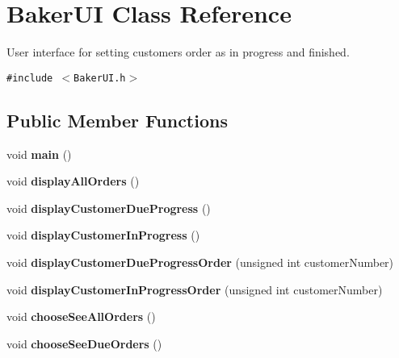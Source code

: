 \hypertarget{class_baker_u_i}{
\section{Baker\-UI Class Reference}
\label{class_baker_u_i}
}
User interface for setting customers order as in progress and finished.  


{\tt \#include $<$Baker\-UI.h$>$}

\subsection*{Public Member Functions}
\begin{CompactItemize}
\item 
\hypertarget{class_baker_u_i_ea83b916b3f52eec32ae6d54d59b4453}{
void {\bf main} ()}
\label{class_baker_u_i_ea83b916b3f52eec32ae6d54d59b4453}

\item 
\hypertarget{class_baker_u_i_d69822b9289cd53fa4da8f4f39864d19}{
void {\bf display\-All\-Orders} ()}
\label{class_baker_u_i_d69822b9289cd53fa4da8f4f39864d19}

\item 
\hypertarget{class_baker_u_i_00eeac47a993278134a2d8ba936f6f31}{
void {\bf display\-Customer\-Due\-Progress} ()}
\label{class_baker_u_i_00eeac47a993278134a2d8ba936f6f31}

\item 
\hypertarget{class_baker_u_i_49612691d8a1c466378d3e4507aff847}{
void {\bf display\-Customer\-In\-Progress} ()}
\label{class_baker_u_i_49612691d8a1c466378d3e4507aff847}

\item 
\hypertarget{class_baker_u_i_9afa245c6153335e553d88f8e7ad2c2e}{
void {\bf display\-Customer\-Due\-Progress\-Order} (unsigned int customer\-Number)}
\label{class_baker_u_i_9afa245c6153335e553d88f8e7ad2c2e}

\item 
\hypertarget{class_baker_u_i_12edcb5c93a8a60d06b8c9de906c4be0}{
void {\bf display\-Customer\-In\-Progress\-Order} (unsigned int customer\-Number)}
\label{class_baker_u_i_12edcb5c93a8a60d06b8c9de906c4be0}

\item 
\hypertarget{class_baker_u_i_d7bd9a6e8c49c52704a9ab4e7c5a1a4c}{
void {\bf choose\-See\-All\-Orders} ()}
\label{class_baker_u_i_d7bd9a6e8c49c52704a9ab4e7c5a1a4c}

\item 
\hypertarget{class_baker_u_i_eaed66fd617380be4adf093146dba169}{
void {\bf choose\-See\-Due\-Orders} ()}
\label{class_baker_u_i_eaed66fd617380be4adf093146dba169}


\end{CompactItemize}
